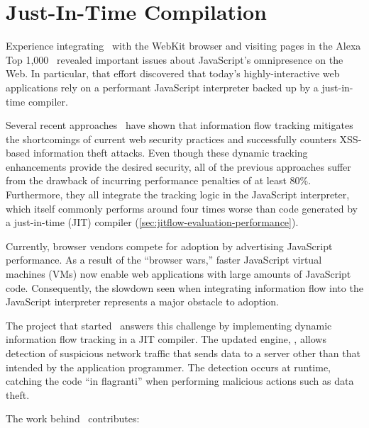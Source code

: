 
\chapter{Just-In-Time Compilation}
\label{ch:jitflow}

\newcommand{\codeline}[1]{line~\code{#1}}
\newcommand{\Codeline}[1]{Line~\code{#1}}
\newcommand{\codelines}[2]{lines~\code{#1}--\code{#2}}
\newcommand{\bcodeline}[1]{offset~\code{#1}}

\newcommand{\jsvalue}[0]{\code{JSValue}}
\newcommand{\jsvalues}[0]{\code{JSValue}s}

Experience integrating \FlowCore\ with the WebKit browser and visiting pages in the Alexa Top 1,000~\cite{alexa} revealed important issues about JavaScript's omnipresence on the Web.
In particular, that effort discovered that today's highly-interactive web applications rely on a performant JavaScript interpreter backed up by a just-in-time compiler.

Several recent approaches~\cite{vogt.etal+07,just.etal+11,groef.etal+12,kerschbaumer.etal+13} have shown that information flow tracking mitigates the shortcomings of current web security practices and successfully counters XSS-based information theft attacks.
Even though these dynamic tracking enhancements provide the desired security, all of the previous approaches suffer from the drawback of incurring performance penalties of at least 80\%.
Furthermore, they all integrate the tracking logic in the JavaScript interpreter, which itself commonly performs around four times worse than code generated by a just-in-time (JIT) compiler (\autoref{sec:jitflow-evaluation-performance}).

Currently, browser vendors compete for adoption by advertising JavaScript performance.
As a result of the ``browser wars,'' faster JavaScript virtual machines (VMs) now enable web applications with large amounts of JavaScript code.
Consequently, the slowdown seen when integrating information flow into the JavaScript interpreter represents a major obstacle to adoption.

The project that started \FlowCore\ answers this challenge by implementing dynamic information flow tracking in a JIT compiler.
The updated engine, \JitFlow, allows detection of suspicious network traffic that sends data to a server other than that intended by the application programmer.
The detection occurs at runtime, catching the code ``in flagranti'' when performing malicious actions such as data theft.

The work behind \JitFlow\ contributes:

